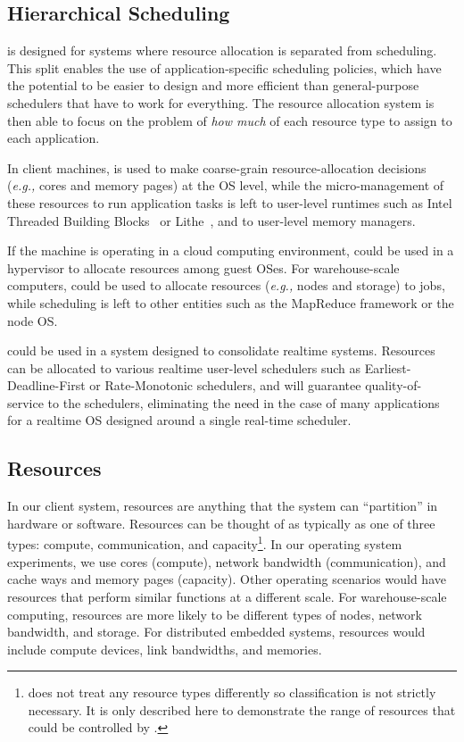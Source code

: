 \subsection{Hierarchical Scheduling}

\pacora is designed for systems where resource allocation is separated
from scheduling.  This split enables the use of application-specific
scheduling policies, which have the potential to be easier to design
and more efficient than general-purpose schedulers that have to work
for everything.  The resource allocation system is then able to focus on the
problem of \emph{how much} of each resource type to assign to each
application.  

In client machines, \pacora is used to make coarse-grain
resource-allocation decisions (\emph{e.g.,} cores and memory pages) at
the OS level, while the micro-management of these resources to run
application tasks is left to user-level runtimes such as Intel
Threaded Building Blocks~\cite{CoMa08} or Lithe~\cite{lithe}, and to
user-level memory managers.

If the machine is operating in a cloud computing environment, \pacora could be used in a hypervisor to allocate
resources among guest OSes. For warehouse-scale computers, \pacora could be used to allocate
resources (\emph{e.g.,} nodes and storage) to jobs, while scheduling is
left to other entities such as the MapReduce framework\cite{mapreduce}
or the node OS.   

\pacora could be used in a system designed to consolidate realtime systems.  Resources can be allocated to various realtime user-level schedulers such as Earliest-Deadline-First or Rate-Monotonic schedulers, and \pacora will guarantee quality-of-service to the schedulers, eliminating the need in the case of many applications for a realtime OS designed around a single real-time scheduler.

\subsection{Resources}

In our client system, resources are anything that the system can ``partition'' in hardware or software.  Resources can be thought of as typically as one of three types: compute, communication, and capacity\footnote{\pacora does not treat any resource types differently so classification is not strictly necessary. It is only described here to demonstrate the range of resources that could be controlled by \pacora.}.
In our operating system experiments, we use cores (compute), network bandwidth (communication), and cache ways and memory pages (capacity).
Other operating scenarios would have resources that perform similar functions at a different scale. For warehouse-scale computing, resources are more
likely to be different types of nodes, network bandwidth, and storage. For distributed embedded systems, resources would include compute devices, link bandwidths, and memories. 

